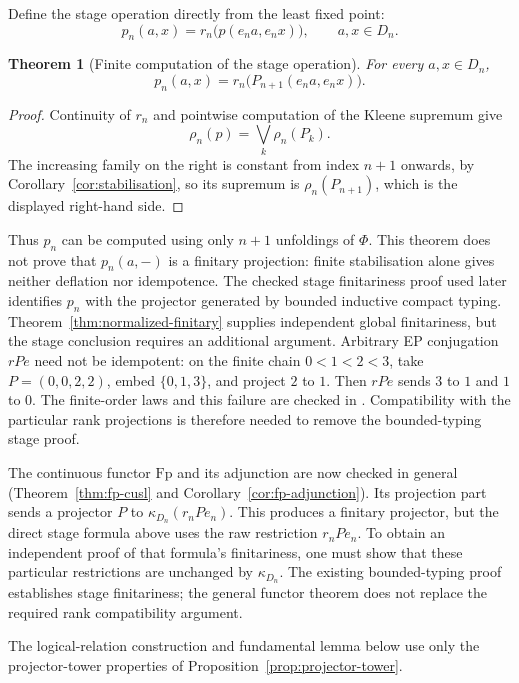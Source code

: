 \documentclass[11pt,a4paper]{article}
\newtheorem{theorem}{Theorem}[section]
\theoremstyle{definition}
\theoremstyle{remark}
\begin{document}
Define the stage operation directly from the least fixed point:
\[
 p_n(a,x)=r_n\bigl(p(e_n a,e_n x)\bigr),
 \qquad a,x\in D_n.
\]

\begin{theorem}[Finite computation of the stage operation]\label{thm:operational}
For every $a,x\in D_n$,
\[
 p_n(a,x)=r_n\bigl(P_{n+1}(e_n a,e_n x)\bigr).
\]
\end{theorem}
\begin{proof}
Continuity of $r_n$ and pointwise computation of the Kleene supremum give
\[
 \rho_n(p)=\bigvee_k\rho_n(P_k).
\]
The increasing family on the right is constant from index $n+1$ onwards,
by Corollary~\ref{cor:stabilisation}, so its supremum is
$\rho_n(P_{n+1})$, which is the displayed right-hand side.
\end{proof}

Thus $p_n$ can be computed using only $n+1$ unfoldings of $\Phi$.
This theorem does not prove that $p_n(a,-)$ is a finitary projection:
finite stabilisation alone gives neither deflation nor idempotence.
The checked stage finitariness proof used later identifies $p_n$ with
the projector generated by bounded inductive compact typing.
Theorem~\ref{thm:normalized-finitary} supplies independent global
finitariness, but the stage conclusion requires an additional argument.
Arbitrary EP conjugation $rPe$ need not be idempotent: on the finite
chain $0<1<2<3$, take $P=(0,0,2,2)$, embed $\{0,1,3\}$, and project
$2$ to $1$. Then $rPe$ sends $3$ to $1$ and $1$ to $0$.
The finite-order laws and this failure are checked in
. Compatibility with the particular
rank projections is therefore needed to remove the bounded-typing
stage proof.

The continuous functor $\mathrm{Fp}$ and its adjunction are now checked
in general (Theorem~\ref{thm:fp-cusl} and
Corollary~\ref{cor:fp-adjunction}). Its projection part sends a projector
$P$ to $\kappa_{D_n}(r_nPe_n)$. This produces a finitary projector,
but the direct stage formula above uses the raw restriction $r_nPe_n$.
To obtain an independent proof of that formula's finitariness, one must
show that these particular restrictions are unchanged by $\kappa_{D_n}$.
The existing bounded-typing proof establishes stage finitariness;
the general functor theorem does not replace the required rank
compatibility argument.


The logical-relation construction and fundamental lemma below use only
the projector-tower properties of Proposition~\ref{prop:projector-tower}.
\end{document}
